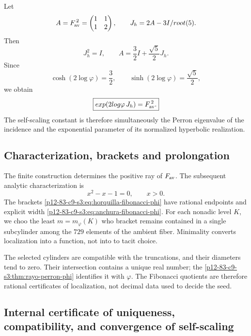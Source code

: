 Let
\[
 A=F_{\rm av}^{\,2}=
 \begin{pmatrix}1&1\\1&2\end{pmatrix},
 \qquad
 J_h=\frac{2A-3I}{\sqrt5}.
\]
Then
\[
 J_h^2=I,
 \qquad
 A=\frac32I+\frac{\sqrt5}{2}J_h.
\]
Since
\[
 \cosh(2\log\varphi)=\frac32,
 \qquad
 \sinh(2\log\varphi)=\frac{\sqrt5}{2},
\]
we obtain
\begin{equation}
 \boxed{
 \exp(2\log\varphi\,J_h)=F_{\rm av}^{\,2}.}
 \label{p12-83-c9-s3:eq:realizacion-hiperbolica-phi}
\end{equation}
The self-scaling constant is therefore simultaneously the Perron
eigenvalue of the incidence and the exponential parameter of its normalized
hyperbolic realization.

\subsection{Characterization, brackets and prolongation}

The finite construction determines the positive ray of \(F_{\rm av}\). The
subsequent analytic characterization is
\[
 x^2-x-1=0,
 \qquad x>0.
\]
The brackets \eqref{p12-83-c9-s3:eq:horquilla-fibonacci-phi} have rational endpoints
and explicit width \eqref{p12-83-c9-s3:eq:anchura-fibonacci-phi}. For each
nonadic level \(K\), we choo the least \(m=m_{\varphi}(K)\) who bracket remains
contained in a single subcylinder among the \(729\) elements of the
ambient fiber. Minimality converts localization into a function, not into to
tacit choice.

The selected cylinders are compatible with the truncations, and their
diameters tend to zero. Their intersection contains a unique real number; the
\cref{p12-83-c9-s3:thm:rayo-perron-phi} identifies it with \(\varphi\). The Fibonacci
quotients are therefore rational certificates of localization, not decimal data
used to decide the seed.

\subsection{Internal certificate of uniqueness, compatibility, and convergence of self-scaling}

